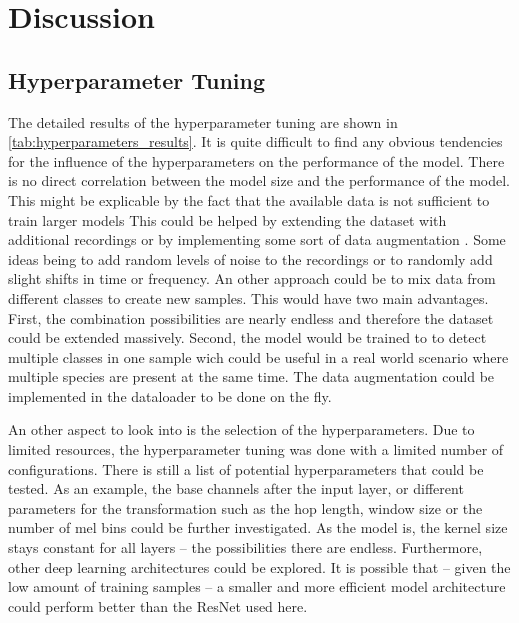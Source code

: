


\section{Discussion}
\label{discussion}

\subsection{Hyperparameter Tuning}%

The detailed results of the hyperparameter tuning are shown in \autoref{tab:hyperparameters_results}.
It is quite difficult to find any obvious tendencies for the influence of the
hyperparameters on the performance of the model. There is no direct correlation
between the model size and the performance of the model. This might be explicable
by the fact that the available data is not sufficient to train larger models
This could be helped by extending the dataset with additional recordings or by
implementing some sort of data augmentation \autocite[3]{stowellComputationalBioacousticsDeep2022}. 
Some ideas being to add random levels of noise to the recordings or to randomly add slight shifts in time or frequency.
An other approach could be to mix data from different classes to create new samples.
This would have two main advantages. First, the combination possibilities are nearly endless
and therefore the dataset could be extended massively. Second, the model would be
trained to to detect multiple classes in one sample wich could be useful in a real
world scenario where multiple species are present at the same time.
The data augmentation could be implemented in the dataloader to be done on the fly.

An other aspect to look into is the selection of the hyperparameters. Due to limited
resources, the hyperparameter tuning was done with a limited number of configurations.
There is still a list of potential hyperparameters that could be tested. As an example,
the base channels after the input layer, or different parameters for the transformation
such as the hop length, window size or the number of mel bins could be further investigated. As the model is, the
kernel size stays constant for all layers -- the possibilities there are endless.
Furthermore, other deep learning architectures could be explored. 
It is possible that -- given the low amount of training samples -- a smaller 
and more efficient model architecture could perform better than the ResNet used here.

